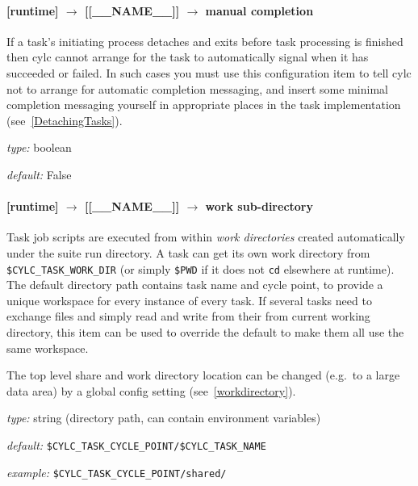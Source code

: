\paragraph[manual completion]{ [runtime] $\rightarrow$ [[\_\_NAME\_\_]] $\rightarrow$ manual completion}

If a task's initiating process detaches and exits before task processing
is finished then cylc cannot arrange for the task to automatically
signal when it has succeeded or failed. In such cases you must use this
configuration item to tell cylc not to arrange for automatic completion
messaging, and insert some minimal completion messaging yourself in
appropriate places in the task implementation (see~\ref{DetachingTasks}).

\begin{myitemize}
\item {\em type:} boolean
\item {\em default:} False
\end{myitemize}

\paragraph[work sub-directory]{[runtime] $\rightarrow$ [[\_\_NAME\_\_]] $\rightarrow$ work sub-directory}
\label{worksubdirectory}

Task job scripts are executed from within {\em work directories} created
automatically under the suite run directory. A task can get its own work
directory from \lstinline=$CYLC_TASK_WORK_DIR= (or simply \lstinline=$PWD= if
it does not \lstinline=cd= elsewhere at runtime). The default directory
path contains task name and cycle point, to provide a unique workspace for
every instance of every task. If several tasks need to exchange files and
simply read and write from their from current working directory, this item
can be used to override the default to make them all use the same workspace.

The top level share and work directory location can be changed (e.g.\ to a
large data area) by a global config setting (see~\ref{workdirectory}). 

\begin{myitemize}
\item {\em type:} string (directory path, can contain environment variables)
\item {\em default:} \lstinline=$CYLC_TASK_CYCLE_POINT/$CYLC_TASK_NAME=
\item {\em example:} \lstinline=$CYLC_TASK_CYCLE_POINT/shared/=
\end{myitemize}

